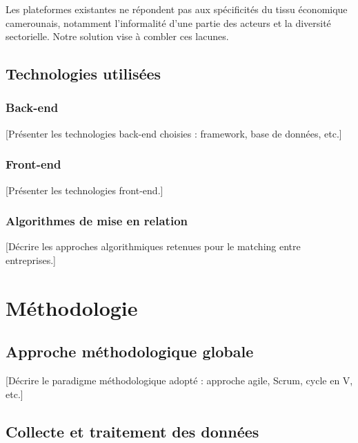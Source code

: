 \documentclass[12pt, a4paper, oneside]{report}
\begin{document}
\begin{important}
  Les plateformes existantes ne répondent pas aux spécificités du tissu économique camerounais, notamment l'informalité d'une partie des acteurs et la diversité sectorielle. Notre solution vise à combler ces lacunes.
\end{important}

\section{Technologies utilisées}
\label{sec:technologies}

\subsection{Back-end}

[Présenter les technologies back-end choisies : framework, base de données, etc.]

\subsection{Front-end}

[Présenter les technologies front-end.]

\subsection{Algorithmes de mise en relation}

[Décrire les approches algorithmiques retenues pour le matching entre entreprises.]

\chapter{Méthodologie}
\label{chap:methodo}

\section{Approche méthodologique globale}

[Décrire le paradigme méthodologique adopté : approche agile, Scrum, cycle en V, etc.]

\section{Collecte et traitement des données}
\label{sec:donnees}
\end{document}
